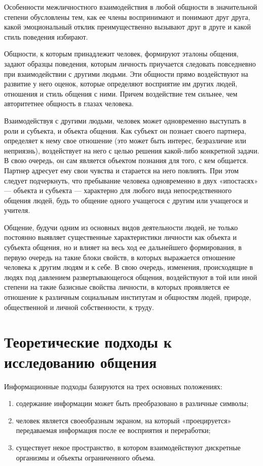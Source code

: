 Особенности межличностного взаимодействия в любой общности в значительной степени обусловлены тем, как ее члены воспринимают и понимают друг друга, какой эмоциональный отклик преимущественно вызывают друг в друге и какой стиль поведения избирают.

Общности, к которым принадлежит человек, формируют эталоны общения, задают образцы поведения, которым личность приучается следовать повседневно при взаимодействии с другими людьми. Эти общности прямо воздействуют на развитие у него оценок, которые определяют восприятие им других людей, отношения и стиль общения с ними. Причем воздействие тем сильнее, чем авторитетнее общность в глазах человека.

Взаимодействуя с другими людьми, человек может одновременно выступать в роли и субъекта, и объекта общения. Как субъект он познает своего партнера, определяет к нему свое отношение (это может быть интерес, безразличие или неприязнь), воздействует на него с целью решения какой-либо конкретной задачи. В свою очередь, он сам является объектом познания для того, с кем общается. Партнер адресует ему свои чувства и старается на него повлиять. При этом следует подчеркнуть, что пребывание человека одновременно в двух «ипостасях» — объекта и субъекта — характерно для любого вида непосредственного общения людей, будь то общение одного учащегося с другим или учащегося и учителя.

Общение, будучи одним из основных видов деятельности людей, не только постоянно выявляет существенные характеристики личности как объекта и субъекта общения, но и влияет на весь ход ее дальнейшего формирования, в первую очередь на такие блоки свойств, в которых выражается отношение человека к другим людям и к себе. В свою очередь, изменения, происходящие в людях под давлением развертывающегося общения, воздействуют в той или иной степени на такие базисные свойства личности, в которых проявляется ее отношение к различным социальным институтам и общностям людей, природе, общественной и личной собственности, к труду.

\section{Теоретические подходы к исследованию общения}
Информационные подходы базируются на трех основных положениях: \cite{9}
\begin{enumerate}
	\item содержание информации может быть преобразовано в различные символы;
	\item человек является своеобразным экраном, на который «проецируется» передаваемая информация после ее восприятия и переработки;
	\item существует некое пространство, в котором взаимодействуют дискретные организмы и объекты ограниченного объема.
\end{enumerate}

